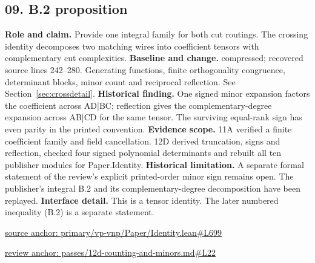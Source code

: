\documentclass[11pt,letterpaper]{article}
\theoremstyle{definition}\newtheorem{definition}[theorem]{Definition}\newtheorem{example}[theorem]{Example}
\theoremstyle{remark}\newtheorem{remark}[theorem]{Remark}
\begin{document}
\subsection*{09. B.2 proposition}
\textbf{Role and claim.} Provide one integral family for both cut routings. The crossing identity decomposes two matching wires into coefficient tensors with complementary cut complexities.
\textbf{Baseline and change.} compressed; recovered source lines 242--280. Generating functions, finite orthogonality congruence, determinant blocks, minor count and reciprocal reflection. See Section~\ref{sec:crossdetail}.
\textbf{Historical finding.} One signed minor expansion factors the coefficient across AD|BC; reflection gives the complementary-degree expansion across AB|CD for the same tensor. The surviving equal-rank sign has even parity in the printed convention.
\textbf{Evidence scope.} 11A verified a finite coefficient family and field cancellation. 12D derived truncation, signs and reflection, checked four signed polynomial determinants and rebuilt all ten publisher modules for Paper.Identity.
\textbf{Historical limitation.} A separate formal statement of the review's explicit printed-order minor sign remains open. The publisher's integral B.2 and its complementary-degree decomposition have been replayed.
\textbf{Interface detail.} This is a tensor identity. The later numbered inequality (B.2) is a separate statement.
\par\href{https://github.com/nousentllc/VP-VNP-Review/blob/8a7976933b6b2b4ffda1ad3a0dfb5fc6b6f023e8/primary/vp-vnp/Paper/Identity.lean\#L699}{source anchor: primary/vp-vnp/Paper/Identity.lean\#L699}
\par\href{https://github.com/nousentllc/VP-VNP-Review/blob/8a7976933b6b2b4ffda1ad3a0dfb5fc6b6f023e8/passes/12d-counting-and-minors.md\#L22}{review anchor: passes/12d-counting-and-minors.md\#L22}
\goodbreak
\end{document}
